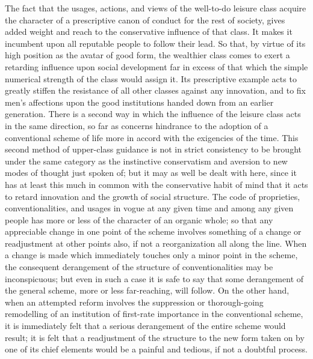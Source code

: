 \documentclass[12pt]{report}
\begin{document}
The fact that the usages, actions, and views of the well-to-do leisure
class acquire the character of a prescriptive canon of conduct for
the rest of society, gives added weight and reach to the conservative
influence of that class. It makes it incumbent upon all reputable people
to follow their lead. So that, by virtue of its high position as the
avatar of good form, the wealthier class comes to exert a retarding
influence upon social development far in excess of that which the
simple numerical strength of the class would assign it. Its prescriptive
example acts to greatly stiffen the resistance of all other classes
against any innovation, and to fix men's affections upon the good
institutions handed down from an earlier generation. There is a second
way in which the influence of the leisure class acts in the same
direction, so far as concerns hindrance to the adoption of a
conventional scheme of life more in accord with the exigencies of
the time. This second method of upper-class guidance is not in strict
consistency to be brought under the same category as the instinctive
conservatism and aversion to new modes of thought just spoken of; but
it may as well be dealt with here, since it has at least this much
in common with the conservative habit of mind that it acts to retard
innovation and the growth of social structure. The code of proprieties,
conventionalities, and usages in vogue at any given time and among any
given people has more or less of the character of an organic whole;
so that any appreciable change in one point of the scheme involves
something of a change or readjustment at other points also, if not
a reorganization all along the line. When a change is made which
immediately touches only a minor point in the scheme, the consequent
derangement of the structure of conventionalities may be inconspicuous;
but even in such a case it is safe to say that some derangement of the
general scheme, more or less far-reaching, will follow. On the
other hand, when an attempted reform involves the suppression or
thorough-going remodelling of an institution of first-rate importance
in the conventional scheme, it is immediately felt that a serious
derangement of the entire scheme would result; it is felt that a
readjustment of the structure to the new form taken on by one of
its chief elements would be a painful and tedious, if not a doubtful
process.
\end{document}
